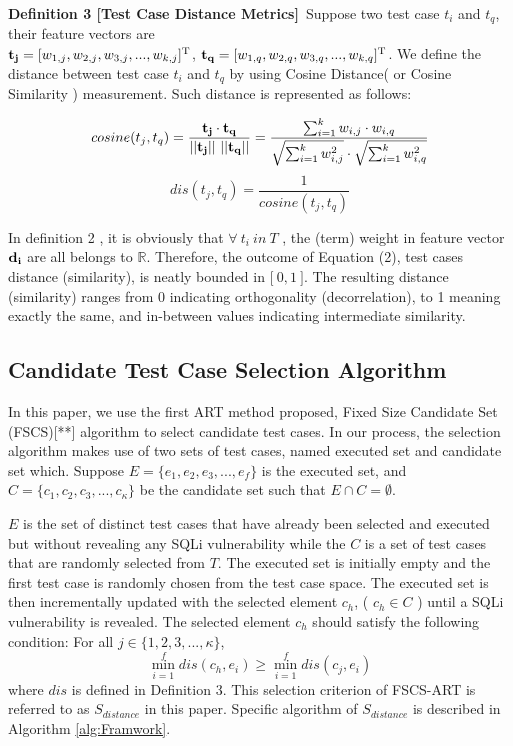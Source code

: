 \documentclass{sig-alternate}
\begin{document}
{\bf Definition 3 [Test Case Distance Metrics]}~Suppose two test case $t_{i}$ and $t_{q}$, their feature vectors are\\ ${\bf t_{j}} = [w_{1,j}, w_{2,j}, w_{3,j},...,w_{k,j}]^{\mathrm T}$, ${\bf t_{q}} = [w_{1,q}, w_{2,q}, w_{3,q},...,w_{k,q}]^{\mathrm T}$. We define the distance between test case $t_{i}$ and $t_{q}$ by using Cosine Distance( or Cosine Similarity ) measurement. Such distance is represented as follows:

\begin{equation}cosine(t_{j}, t_{q}) = \frac{  {\bf t_{j}} \cdot {\bf t_{q} } }{ || {\bf t_{j} } || ~||  {\bf t_{q}} || } = \frac{ \sum_{i=1}^{k} w_{i,j}\cdot w_{i,q} }{\sqrt{  \sum_{i=1}^{k} w_{i,j}^{2} } \cdot \sqrt{ \sum_{i=1}^{k} w_{i,q}^{2}  }  }\end{equation}
\begin{equation}
dis(t_{j}, t_{q}) = \frac{1}{cosine(t_{j}, t_{q})}
\end{equation}

In definition 2 , it is obviously that $\forall ~t_{i}~ in ~T$ , the (term) weight in feature vector $\bf d_{i}$ are all belongs to $\mathbb{R}$. Therefore, the outcome of Equation (2), test cases distance (similarity), is neatly bounded in $\lbrack ~0, 1 ~\rbrack$. The resulting distance (similarity) ranges from 0 indicating orthogonality (decorrelation), to 1 meaning exactly the same, and in-between values indicating intermediate similarity.




\subsection{Candidate Test Case Selection Algorithm}
In this paper,  we use the first ART method proposed, Fixed Size Candidate Set (FSCS)[**] algorithm to select candidate test cases. In our process, the selection algorithm makes use of two sets of test cases, named executed set and candidate set which. Suppose $E = \{e_{1}, e_{2}, e_{3}, ..., e_{f}\}$ is the executed set, and $C= \{c_{1}, c_{2}, c_{3}, ..., c_{\kappa}\}$ be the candidate set such that $E \cap C = \emptyset$.  


 $E$ is the set of distinct test cases that have already been selected and executed but without revealing any SQLi vulnerability while the $C$ is a set of test cases that are randomly selected from $T$. The executed set is initially empty and the first test case is randomly chosen from the test case space. The executed set is then incrementally updated with the selected element $c_{h}$, ( $c_{h} \in C$ ) until a SQLi vulnerability is revealed. The selected element $c_{h}$ should satisfy the following condition:
For all $ j \in \{1, 2, 3, ..., \kappa\} $, $$\min_{i=1}^{f} dis(c_{h}, e_{i}) \geq \min_{i=1}^{f} dis(c_{j}, e_{i}) $$
where $dis$ is defined in Definition 3. This selection criterion of FSCS-ART is referred to as $S_{distance}$ in this paper. Specific algorithm of $S_{distance}$ is described in Algorithm \ref{alg:Framwork}.
\end{document}
